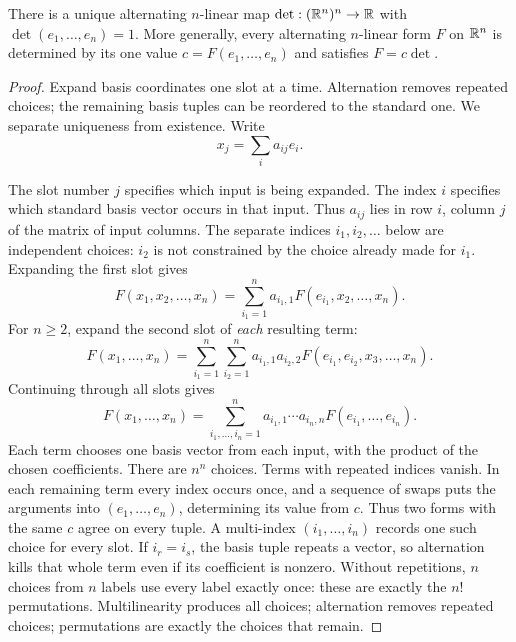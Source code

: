 \begin{theorem}
\label{thm:determinant-form}
There is a unique alternating $n$-linear map
$\det:(\mathbb{R}^n)^n\to\mathbb{R}$ with $\det(e_1,\ldots,e_n)=1$.
More generally, every alternating $n$-linear form $F$ on $\mathbb{R}^n$ is
determined by its one value $c=F(e_1,\ldots,e_n)$ and satisfies $F=c\det$.
\end{theorem}
\begin{proof}
Expand basis coordinates one slot at a time. Alternation
removes repeated choices; the remaining basis tuples can be reordered
to the standard one. We separate uniqueness from existence.
Write
\[
x_j=\sum_i a_{ij}e_i.
\]

The slot number $j$ specifies which input is being expanded. The index
$i$ specifies which standard basis vector occurs in that input. Thus
$a_{ij}$ lies in row $i$, column $j$ of the matrix of input columns.
The separate indices $i_1,i_2,\ldots$ below are independent choices:
$i_2$ is not constrained by the choice already made for $i_1$. Expanding the first slot gives
\[
F(x_1,x_2,\ldots,x_n)=\sum_{i_1=1}^n a_{i_1,1}F(e_{i_1},x_2,\ldots,x_n).
\]
For $n\geq2$, expand the second slot of \emph{each} resulting term:
\[
F(x_1,\ldots,x_n)=\sum_{i_1=1}^n\sum_{i_2=1}^n
a_{i_1,1}a_{i_2,2}F(e_{i_1},e_{i_2},x_3,\ldots,x_n).
\]
Continuing through all slots gives
\[
F(x_1,\ldots,x_n)=\sum_{i_1,\ldots,i_n=1}^n
a_{i_1,1}\cdots a_{i_n,n}F(e_{i_1},\ldots,e_{i_n}).
\]
Each term chooses one basis vector from each input, with the product of
the chosen coefficients. There are $n^n$ choices. Terms with repeated
indices vanish. In each remaining term every index occurs once, and a
sequence of swaps puts the arguments into $(e_1,\ldots,e_n)$, determining
its value from $c$. Thus two forms with the same $c$ agree on every tuple.
A multi-index $(i_1,\ldots,i_n)$ records one such choice for every
slot. If $i_r=i_s$, the basis tuple repeats a vector, so alternation
kills that whole term even if its coefficient is nonzero. Without
repetitions, $n$ choices from $n$ labels use every label exactly once:
these are exactly the $n!$ permutations. Multilinearity produces all
choices; alternation removes repeated choices; permutations are exactly
the choices that remain.


\end{proof}
